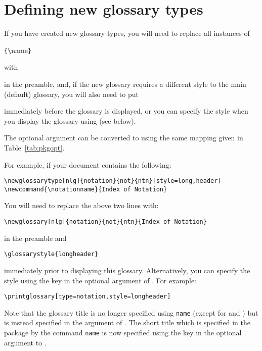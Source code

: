 \documentclass{nlctdoc}
\newenvironment{oldway}{%
  \begin{labelledbox}{\styfmt{glossary}}\ttfamily\obeylines
}{%
  \end{labelledbox}%
}
\newenvironment{newway}{%
  \begin{labelledbox}{\styfmt{glossaries}}\ttfamily\obeylines
}{%
  \end{labelledbox}%
}
\begin{document}
\section{Defining new glossary types}

If you have created new glossary types, you will need to 
replace all instances of
\begin{oldway}
\newline
{}\verb|{\|name\verb|}|
\end{oldway}%
with
\begin{newway}
\end{newway}%
in the preamble, and, if the new glossary requires a different style
to the main (default) glossary, you will also need to put
\begin{newway}
\end{newway}%
immediately before the glossary is displayed, or you can specify
the style when you display the glossary using 
(see below). 

The  optional argument can be converted to
 using the same mapping given in 
Table~\ref{tab:pkgopt}.

For example, if your document contains the following:
\begin{verbatim}
\newglossarytype[nlg]{notation}{not}{ntn}[style=long,header]
\newcommand{\notationname}{Index of Notation}
\end{verbatim}
You will need to replace the above two lines with:
\begin{verbatim}
\newglossary[nlg]{notation}{not}{ntn}{Index of Notation}
\end{verbatim}
in the preamble and
\begin{verbatim}
\glossarystyle{longheader}
\end{verbatim}
immediately prior to displaying this glossary. Alternatively, you
can specify the style using the  key in
the optional argument of . For example:
\begin{verbatim}
\printglossary[type=notation,style=longheader]
\end{verbatim}

Note that the glossary title is no longer specified using
\cs{}\texttt{name} (except for 
and ) but is instead specified in the 
argument of . The short title which is specified in
the  package by the command
\texttt{name} is now specified using
the  key in the optional argument to
.
\end{document}
